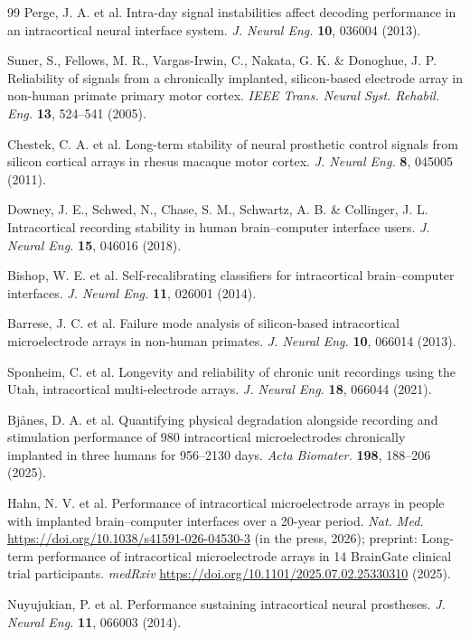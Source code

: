 \begin{thebibliography}{99}
 Perge, J. A. et al. Intra-day signal instabilities affect decoding performance in an intracortical neural interface system. \textit{J. Neural Eng.} \textbf{10}, 036004 (2013).

 Suner, S., Fellows, M. R., Vargas-Irwin, C., Nakata, G. K. \& Donoghue, J. P. Reliability of signals from a chronically implanted, silicon-based electrode array in non-human primate primary motor cortex. \textit{IEEE Trans. Neural Syst. Rehabil. Eng.} \textbf{13}, 524--541 (2005).

 Chestek, C. A. et al. Long-term stability of neural prosthetic control signals from silicon cortical arrays in rhesus macaque motor cortex. \textit{J. Neural Eng.} \textbf{8}, 045005 (2011).

 Downey, J. E., Schwed, N., Chase, S. M., Schwartz, A. B. \& Collinger, J. L. Intracortical recording stability in human brain--computer interface users. \textit{J. Neural Eng.} \textbf{15}, 046016 (2018).

 Bishop, W. E. et al. Self-recalibrating classifiers for intracortical brain--computer interfaces. \textit{J. Neural Eng.} \textbf{11}, 026001 (2014).

 Barrese, J. C. et al. Failure mode analysis of silicon-based intracortical microelectrode arrays in non-human primates. \textit{J. Neural Eng.} \textbf{10}, 066014 (2013).

 Sponheim, C. et al. Longevity and reliability of chronic unit recordings using the Utah, intracortical multi-electrode arrays. \textit{J. Neural Eng.} \textbf{18}, 066044 (2021).

 Bj{\aa}nes, D. A. et al. Quantifying physical degradation alongside recording and stimulation performance of 980 intracortical microelectrodes chronically implanted in three humans for 956--2130 days. \textit{Acta Biomater.} \textbf{198}, 188--206 (2025).

 Hahn, N. V. et al. Performance of intracortical microelectrode arrays in people with implanted brain--computer interfaces over a 20-year period. \textit{Nat. Med.} \url{https://doi.org/10.1038/s41591-026-04530-3} (in the press, 2026); preprint: Long-term performance of intracortical microelectrode arrays in 14 BrainGate clinical trial participants. \textit{medRxiv} \url{https://doi.org/10.1101/2025.07.02.25330310} (2025).

 Nuyujukian, P. et al. Performance sustaining intracortical neural prostheses. \textit{J. Neural Eng.} \textbf{11}, 066003 (2014).


\end{thebibliography}

